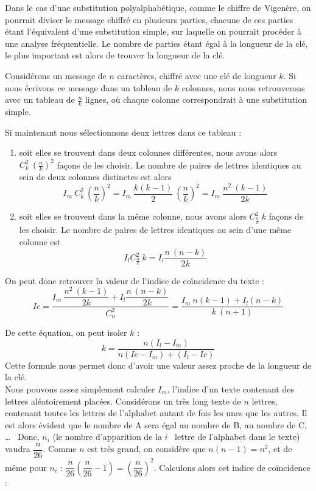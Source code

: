 Dans le cas d'une substitution polyalphabétique, comme le chiffre
de Vigenère, on pourrait diviser le message chiffré en plusieurs
parties, chacune de ces parties étant l'équivalent d'une
substitution simple, sur laquelle on pourrait procéder à une
analyse fréquentielle. Le nombre de parties étant égal à la
longueur de la clé, le plus important est alors de trouver la
longueur de la clé.

Considérons un message de $n$ caractères, chiffré avec une clé de
longueur $k$. Si nous écrivons ce message dans un tableau de $k$
colonnes, nous nous retrouverons avec un tableau de $\frac{n}{k}$
lignes, où chaque colonne correspondrait à une substitution
simple.

Si maintenant nous sélectionnons deux lettres dans ce tableau :
\begin{enumerate}
  \item soit elles se trouvent dans deux colonnes différentes, 
nous avons
alors $C_k^2 ~ (\frac{n}{k})^2$ façons de les choisir. Le nombre
de paires de lettres identiques au sein de deux colonnes distinctes
est alors
\[ I_m ~ C_k^2 ~ \left(\dfrac{n}{k}\right)^2 = 
I_m ~ \dfrac{k (k - 1)}{2} ~
\left(\dfrac{n}{k}\right)^2 = I_m ~ \dfrac{n^2 ~ (k-1)}{2k} \]
  \item soit elles se trouvent dans la même colonne, nous avons
alors $C_{\frac{n}{k}}^2 ~ k $ façons de les choisir. Le nombre de
paires de lettres %
identiques au sein d'une même colonne est
\[ I_l C_{\frac{n}{k}}^2 ~ k = I_l
\dfrac{n ~ (n-k)}{2k} \]
\end{enumerate}

On peut donc retrouver la valeur de l'indice de coïncidence du
texte :
\[Ic = \dfrac{I_m ~ \dfrac{n^2 ~ (k-1)}{2k} +
I_l \dfrac{n ~ (n-k)}{2k}}{C_n^2} =
\dfrac{I_m ~ n (k-1) + I_l (n-k)}{k ~
(n+1)} \]

De cette équation, on peut isoler $k$ :
\[k = \dfrac{n (I_l - I_m)}{n (Ic - I_m) + (I_l - Ic)} \]
Cette formule nous permet donc d'avoir une valeur assez proche de
la longueur de la clé.
\\

Nous pouvons assez simplement calculer $I_m$, l'indice d'un texte
contenant des lettres aléatoirement placées. Considérons un très
long texte de $n$ lettres, contenant toutes les lettres de
l'alphabet autant de fois les unes que les autres.
 Il est alors évident que le nombre de A
sera égal au nombre de B, au nombre de C, \dots~
Donc, $n_i$ (le nombre d'apparition de la $i$\ieme~ lettre de
l'alphabet dans le texte) vaudra $\dfrac{n}{26}$.
Comme $n$ est très grand, on considère que $n (n-1) = n^2$, et de
même pour $n_i$ : $\dfrac{n}{26} \left(\dfrac{n}{26} - 1\right) =
\left(\dfrac{n}{26}\right)^2$.
Calculons alors cet indice de coïncidence :

